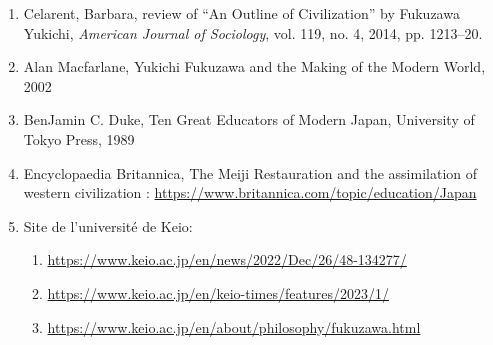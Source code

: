 \documentclass[11pt,a4paper]{article}
\begin{document}
\begin{enumerate}[leftmargin=1.3em,itemsep=.18em,topsep=.25em]
\def\labelenumi{\arabic{enumi}.}
\item
  Celarent, Barbara, review of ``An Outline of Civilization'' by Fukuzawa Yukichi, \emph{American Journal of Sociology}, vol. 119, no. 4, 2014, pp. 1213--20.
\item
  Alan Macfarlane, Yukichi Fukuzawa and the Making of the Modern World, 2002
\item
  BenJamin C. Duke, Ten Great Educators of Modern Japan, University of Tokyo Press, 1989
\item
  Encyclopaedia Britannica, The Meiji Restauration and the assimilation of western civilization : \url{https://www.britannica.com/topic/education/Japan}
\item
  Site de l'université de Keio:

\begin{enumerate}[leftmargin=1.3em,itemsep=.18em,topsep=.25em]
  \def\labelenumii{\alph{enumii}.}
  \item
    \url{https://www.keio.ac.jp/en/news/2022/Dec/26/48-134277/}
  \item
    \url{https://www.keio.ac.jp/en/keio-times/features/2023/1/}
  \item
    \url{https://www.keio.ac.jp/en/about/philosophy/fukuzawa.html}
  \end{enumerate}
\end{enumerate}
\end{document}
